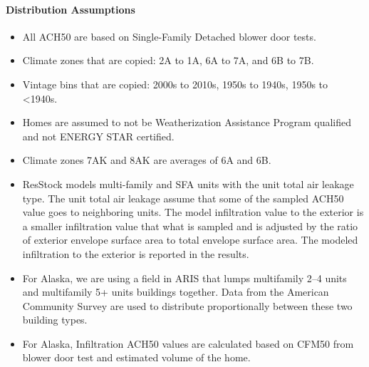 \paragraph{Distribution Assumptions}
% 
\begin{itemize}

\item
  All ACH50 are based on Single-Family Detached blower door tests.
\item
  Climate zones that are copied: 2A to 1A, 6A to 7A, and 6B to 7B.
\item
  Vintage bins that are copied: 2000s to 2010s, 1950s to 1940s, 1950s to
  \textless1940s.
\item
  Homes are assumed to not be Weatherization Assistance Program
  qualified and not ENERGY STAR certified.
\item
  Climate zones 7AK and 8AK are averages of 6A and 6B.
\item ResStock models multi-family and SFA units with the unit total air leakage type. The unit total air leakage assume that some of the sampled ACH50 value goes to neighboring units. The model infiltration value to the exterior is a smaller infiltration value that what is sampled and is adjusted by the ratio of exterior envelope surface area to total envelope surface area. The modeled infiltration to the exterior is reported in the results.
\item
  For Alaska, we are using a field in ARIS that lumps multifamily 2--4
  units and multifamily 5+ units buildings together. Data from the
  American Community Survey are used to distribute proportionally between these two
  building types.
\item
  For Alaska, Infiltration ACH50 values are calculated based on CFM50
  from blower door test and estimated volume of the home.
\end{itemize}
